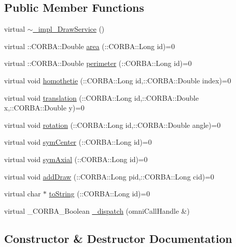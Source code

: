 \subsection*{Public Member Functions}
\begin{DoxyCompactItemize}
\item 
virtual \hyperlink{class__impl___draw_service_abc5f8fe906c4a25bf7c383522c7de6f0}{$\sim$\+\_\+impl\+\_\+\+Draw\+Service} ()
\item 
virtual \+::C\+O\+R\+B\+A\+::\+Double \hyperlink{class__impl___draw_service_a56f247aa66ce6d19f0efb668bef1c98c}{area} (\+::C\+O\+R\+B\+A\+::\+Long id)=0
\item 
virtual \+::C\+O\+R\+B\+A\+::\+Double \hyperlink{class__impl___draw_service_acea99a5740af9baaaca7e31cf811b1f5}{perimeter} (\+::C\+O\+R\+B\+A\+::\+Long id)=0
\item 
virtual void \hyperlink{class__impl___draw_service_aa5dfb4b031e2f90522da143f3effcf05}{homothetie} (\+::C\+O\+R\+B\+A\+::\+Long id,\+::C\+O\+R\+B\+A\+::\+Double index)=0
\item 
virtual void \hyperlink{class__impl___draw_service_a16a7618df309aa42a6c54db76b288cb8}{translation} (\+::C\+O\+R\+B\+A\+::\+Long id,\+::C\+O\+R\+B\+A\+::\+Double x,\+::C\+O\+R\+B\+A\+::\+Double y)=0
\item 
virtual void \hyperlink{class__impl___draw_service_a3a326593c83412786dec749736471ef9}{rotation} (\+::C\+O\+R\+B\+A\+::\+Long id,\+::C\+O\+R\+B\+A\+::\+Double angle)=0
\item 
virtual void \hyperlink{class__impl___draw_service_aea4e775f321ba6cdc625337001e0bb17}{sym\+Center} (\+::C\+O\+R\+B\+A\+::\+Long id)=0
\item 
virtual void \hyperlink{class__impl___draw_service_a72090bd05cc79fc89fac766aa7d21132}{sym\+Axial} (\+::C\+O\+R\+B\+A\+::\+Long id)=0
\item 
virtual void \hyperlink{class__impl___draw_service_a4e609f28be9ac2f4d15fcc3abdc17270}{add\+Draw} (\+::C\+O\+R\+B\+A\+::\+Long pid,\+::C\+O\+R\+B\+A\+::\+Long cid)=0
\item 
virtual char $\ast$ \hyperlink{class__impl___draw_service_a7b115f6ba7092715c74ad6be39a29a03}{to\+String} (\+::C\+O\+R\+B\+A\+::\+Long id)=0
\item 
virtual \+\_\+\+C\+O\+R\+B\+A\+\_\+\+Boolean \hyperlink{class__impl___draw_service_a12bd1d1156617ee727eb120028728d65}{\+\_\+dispatch} (omni\+Call\+Handle \&)
\end{DoxyCompactItemize}


\subsection{Constructor \& Destructor Documentation}
